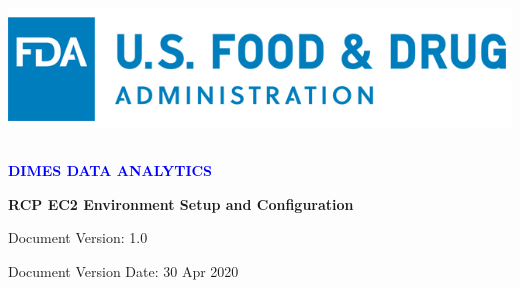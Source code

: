 \documentclass[letterpaper]{article}
\title{}
\author{}
\date{30 Apr 2020}
\newcommand\textstyleInfoBlueChari[1]{\textrm{\textit{\textcolor{blue}{#1}}}}
\begin{document}
\clearpage\setcounter{page}{1}\pagestyle{Standard}
\thispagestyle{FirstPage}

\bigskip


\bigskip


\bigskip


\bigskip


\bigskip



\begin{center}
\includegraphics[width=16.51cm,height=3.958cm]{FDA_document_template_image001.png}
\end{center}

\vspace*{6cm}


\begin{center}
 
\textcolor{cyan}{\hrulefill}

\textbf{\textcolor{blue}{DIMES DATA ANALYTICS}}
\par



\color[rgb]{0.19607843,0.24313726,0.30980393}
\textbf{RCP EC2 Environment Setup and Configuration\linebreak}
\par

\textcolor{cyan}{\hrulefill}
\end{center}

\vspace*{2cm}

{\centering
Document Version: \textup{1.0}
\par}

{\centering
Document Version Date: 30 Apr 2020
\par}


\bigskip


\bigskip


\bigskip


\end{document}
